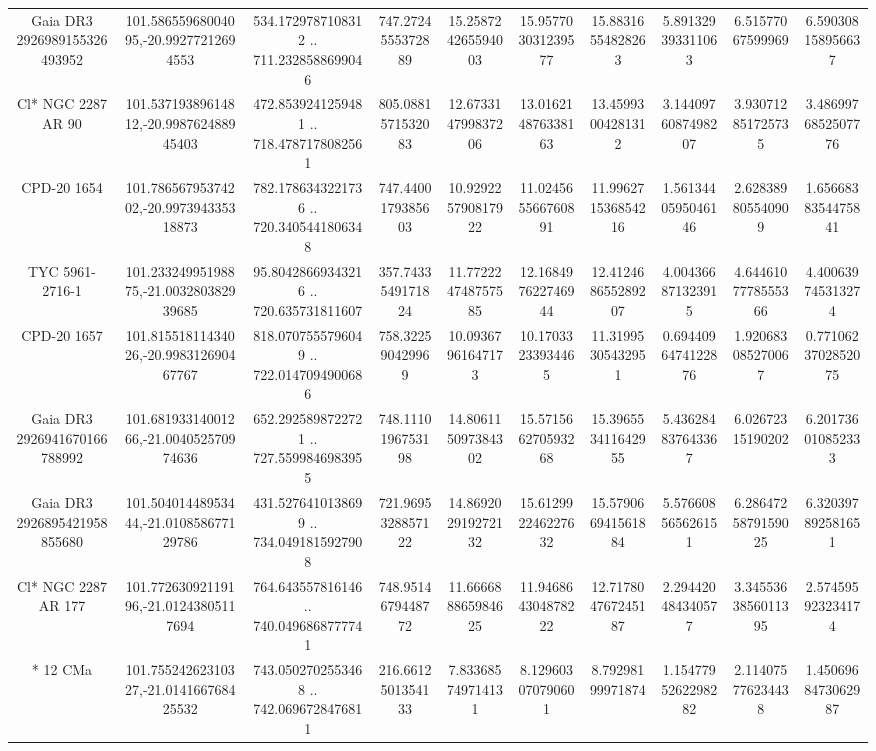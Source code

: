 \begin{table}
\begin{tabular}{cccccccccc}
Gaia DR3 2926989155326493952 & 101.58655968004095,-20.99277212694553 & 534.1729787108312 .. 711.2328588699046 & 747.2724555372889 & 15.258724265594003 & 15.957703031239577 & 15.88316554828263 & 5.891329393311063 & 6.51577067599969 & 6.590308158956637 \\
Cl* NGC 2287     AR      90 & 101.53719389614812,-20.998762488945403 & 472.8539241259481 .. 718.4787178082561 & 805.0881571532083 & 12.673314799837206 & 13.016214876338163 & 13.45993004281312 & 3.1440976087498207 & 3.930712851725735 & 3.4869976852507776 \\
CPD-20  1654 & 101.78656795374202,-20.997394335318873 & 782.1786343221736 .. 720.3405441806348 & 747.4400179385603 & 10.929225790817922 & 11.024565566760891 & 11.996271536854216 & 1.5613440595046146 & 2.628389805540909 & 1.6566838354475841 \\
TYC 5961-2716-1 & 101.23324995198875,-21.003280382939685 & 95.80428669343216 .. 720.635731811607 & 357.7433549171824 & 11.772224748757585 & 12.168497622746944 & 12.412468655289207 & 4.004366871323915 & 4.6446107778555366 & 4.400639745313274 \\
CPD-20  1657 & 101.81551811434026,-20.998312690467767 & 818.0707555796049 .. 722.0147094900686 & 758.322590429969 & 10.09367961647173 & 10.17033233934465 & 11.31995305432951 & 0.6944096474122876 & 1.920683085270067 & 0.7710623702852075 \\
Gaia DR3 2926941670166788992 & 101.68193314001266,-21.004052570974636 & 652.2925898722721 .. 727.5599846983955 & 748.1110196753198 & 14.806115097384302 & 15.571566270593268 & 15.396553411642955 & 5.436284837643367 & 6.02672315190202 & 6.201736010852333 \\
Gaia DR3 2926895421958855680 & 101.50401448953444,-21.010858677129786 & 431.5276410138699 .. 734.0491815927908 & 721.9695328857122 & 14.869202919272132 & 15.612992246227632 & 15.579066941561884 & 5.576608565626151 & 6.2864725879159025 & 6.320397892581651 \\
Cl* NGC 2287     AR     177 & 101.77263092119196,-21.01243805117694 & 764.643557816146 .. 740.0496868777741 & 748.9514679448772 & 11.666688865984625 & 11.946864304878222 & 12.717804767245187 & 2.294420484340577 & 3.3455363856011395 & 2.574595923234174 \\
*  12 CMa & 101.75524262310327,-21.014166768425532 & 743.0502702553468 .. 742.0696728476811 & 216.6612501354133 & 7.833685749714131 & 8.129603070790601 & 8.79298199971874 & 1.1547795262298282 & 2.114075776234438 & 1.4506968473062987 \\

\end{tabular}
\end{table}
